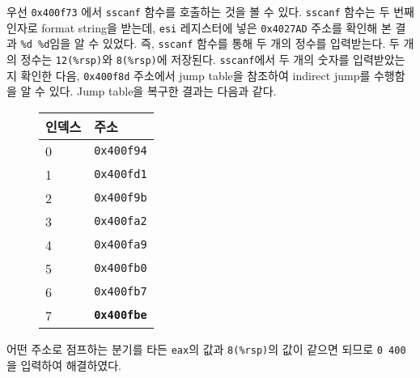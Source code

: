 \documentclass{scrartcl}
\begin{document}
우선 \texttt{0x400f73} 에서 \texttt{sscanf} 함수를 호출하는 것을 볼 수 있다.
\texttt{sscanf} 함수는 두 번째 인자로 format string을 받는데, \texttt{esi}
레지스터에 넣은 \texttt{0x4027AD} 주소를 확인해 본 결과 \texttt{\%d \%d}임을 알
수 있었다. 즉, \texttt{sscanf} 함수를 통해 두 개의 정수를 입력받는다. 두 개의
정수는 \texttt{12(\%rsp)}와 \texttt{8(\%rsp)}에 저장된다. \texttt{sscanf}에서
두 개의 숫자를 입력받았는지 확인한 다음, \texttt{0x400f8d} 주소에서 jump
table을 참조하여 indirect jump를 수행함을 알 수 있다. Jump table을 복구한
결과는 다음과 같다.
\begin{figure}[H]
  \centering
  \begin{tabular}{|l|l|}
    \hline
    인덱스 & 주소                         \\
    \hline
    0   & \texttt{0x400f94}          \\
    1   & \texttt{0x400fd1}          \\
    2   & \texttt{0x400f9b}          \\
    3   & \texttt{0x400fa2}          \\
    4   & \texttt{0x400fa9}          \\
    5   & \texttt{0x400fb0}          \\
    6   & \texttt{0x400fb7}          \\
    7   & \textbf{\texttt{0x400fbe}} \\
    \hline
  \end{tabular}
\end{figure}
어떤 주소로 점프하는 분기를 타든 \texttt{eax}의 값과 \texttt{8(\%rsp)}의 값이
같으면 되므로 \texttt{0 400}을 입력하여 해결하였다.
\end{document}
